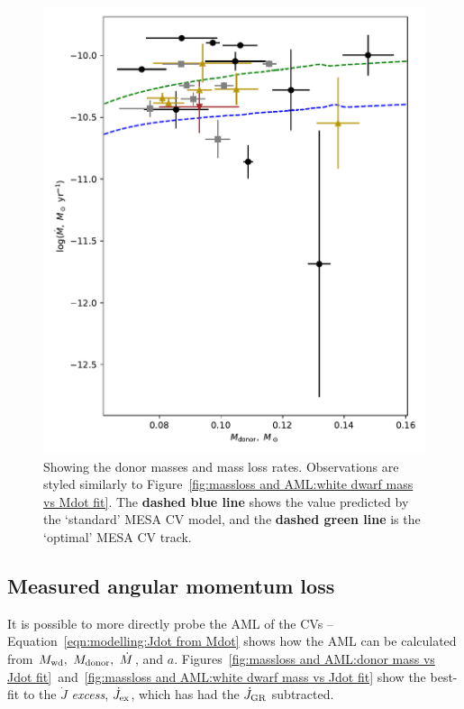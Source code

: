 \begin{figure}
    \centering
    \includegraphics[width=\textwidth]{figures/results/Mdot/Mr_Mdot_nofit.pdf}
    \caption{Showing the donor masses and mass loss rates. Observations are styled similarly to Figure~\ref{fig:massloss and AML:white dwarf mass vs Mdot fit}. The {\bf dashed blue line} shows the value predicted by the `standard' MESA CV model, and the {\bf dashed green line} is the `optimal' MESA CV track.}
    \label{fig:massloss and AML:donor mass vs Mdot fit}
\end{figure}

\newpage
\subsection{Measured angular momentum loss}

It is possible to more directly probe the AML of the CVs -- Equation~\ref{eqn:modelling:Jdot from Mdot} shows how the AML can be calculated from $M_{\rm wd},\ M_{\rm donor},\ \dot M$, and $a$.
Figures~\ref{fig:massloss and AML:donor mass vs Jdot fit}~and~\ref{fig:massloss and AML:white dwarf mass vs Jdot fit} show the best-fit to the $\dot J$ \textit{excess}, $\dot J_{\rm ex}$, which has had the $\dot J_{\rm GR}$ subtracted.

